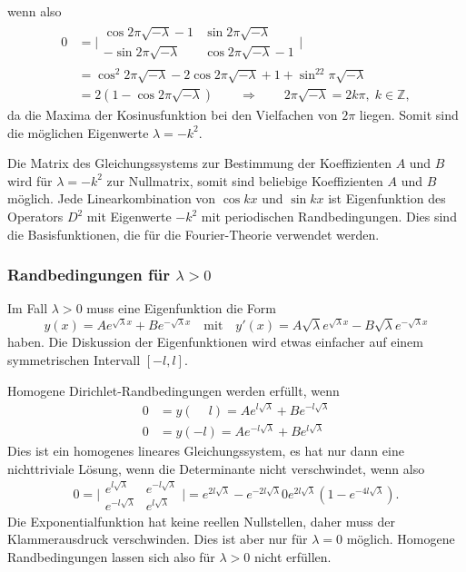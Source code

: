 wenn also
\begin{align*}
0
&=
\biggl|\begin{matrix}
\cos 2\pi\sqrt{-\lambda}-1 & \sin 2\pi\sqrt{-\lambda}   \\
-\sin 2\pi\sqrt{-\lambda}  & \cos 2\pi\sqrt{-\lambda}-1
\end{matrix}\biggr|
\\
&=
\cos^2 2\pi\sqrt{-\lambda} -2\cos2\pi\sqrt{-\lambda}+1
+
\sin^22\pi\sqrt{-\lambda}
\\
&=
2(1-\cos2\pi\sqrt{-\lambda})
\qquad\Rightarrow\qquad
2\pi\sqrt{-\lambda} = 2k\pi,\;k\in\mathbb{Z},
\end{align*}
da die Maxima der Kosinusfunktion bei den Vielfachen von $2\pi$ liegen.
Somit sind die möglichen Eigenwerte $\lambda=-k^2$.

Die Matrix des Gleichungssystems zur Bestimmung der Koeffizienten $A$ und $B$
wird für $\lambda=-k^2$ zur Nullmatrix, somit sind beliebige Koeffizienten
$A$ und $B$ möglich.
Jede Linearkombination von $\cos kx$ und $\sin kx$ ist Eigenfunktion
des Operators $D^2$ mit Eigenwerte $-k^2$ mit periodischen Randbedingungen.
Dies sind die Basisfunktionen, die für die Fourier-Theorie verwendet
werden.

%
%
\subsubsection{Randbedingungen für $\lambda > 0$}
Im Fall $\lambda >0$ muss eine Eigenfunktion die Form
\[
y(x)
=
Ae^{\sqrt{\lambda}x}
+
Be^{-\sqrt{\lambda}x}
\quad\text{mit}\quad
y'(x)
=
A\sqrt{\lambda}e^{\sqrt{\lambda}x}
-
B\sqrt{\lambda}e^{-\sqrt{\lambda}x}
\]
haben.
Die Diskussion der Eigenfunktionen wird etwas einfacher auf einem
symmetrischen Intervall $[-l,l]$.

Homogene Dirichlet-Randbedingungen werden erfüllt, wenn
\begin{align*}
0&=y(\phantom{-}l) = Ae^{l\sqrt{\lambda}} + Be^{-l\sqrt{\lambda}}
\\
0&=y(         - l) = Ae^{-l\sqrt{\lambda}} + Be^{l\sqrt{\lambda}}
\end{align*}
Dies ist ein homogenes lineares Gleichungssystem, es hat nur dann eine
nichttriviale Lösung, wenn die Determinante nicht verschwindet, wenn also
\[
0
=
\biggl|
\begin{matrix}
e^{l\sqrt{\lambda}}  & e^{-l\sqrt{\lambda}} \\
e^{-l\sqrt{\lambda}} & e^{l\sqrt{\lambda}}
\end{matrix}
\biggr|
=
e^{2l\sqrt{\lambda}} - e^{-2l\sqrt{\lambda}}
0
e^{2l\sqrt{\lambda}} ( 1 - e^{-4l\sqrt{\lambda}}).
\]
Die Exponentialfunktion hat keine reellen Nullstellen, daher
muss der Klammerausdruck verschwinden.
Dies ist aber nur für $\lambda=0$ möglich.
Homogene Randbedingungen lassen sich also für $\lambda>0$ nicht erfüllen.

